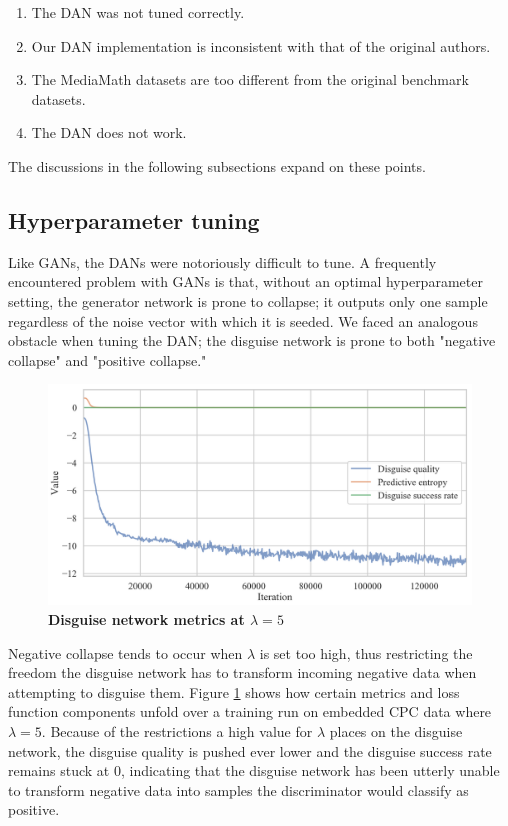 \documentclass{proc}
\begin{document}
\begin{enumerate}
    \item{The DAN was not tuned correctly.}
    \item{Our DAN implementation is inconsistent with that of the original authors.}
    \item{The MediaMath datasets are too different from the original benchmark datasets.}
    \item{The DAN does not work.}
\end{enumerate}

The discussions in the following subsections expand on these points.

\subsection{Hyperparameter tuning}

Like GANs, the DANs were notoriously difficult to tune. A frequently encountered problem with GANs is that, without an optimal hyperparameter setting, the generator network is prone to collapse; it outputs only one sample regardless of the noise vector with which it is seeded. We faced an analogous obstacle when tuning the DAN; the disguise network is prone to both "negative collapse" and "positive collapse."

\begin{figure}[h!]
		\includegraphics*[scale=0.23]{../figures/neg-collapse-1.png}
		\caption{\textbf{Disguise network metrics at $\lambda = 5$}}
		\label{fig:neg-collapse-1}
\end{figure}

Negative collapse tends to occur when $\lambda$ is set too high, thus restricting the freedom the disguise network has to transform incoming negative data when attempting to disguise them. Figure \ref{fig:neg-collapse-1} shows how certain metrics and loss function components unfold over a training run on embedded CPC data where $\lambda=5$. Because of the restrictions a high value for $\lambda$ places on the disguise network, the disguise quality is pushed ever lower and the disguise success rate remains stuck at $0$, indicating that the disguise network has been utterly unable to transform negative data into samples the discriminator would classify as positive.
\end{document}
